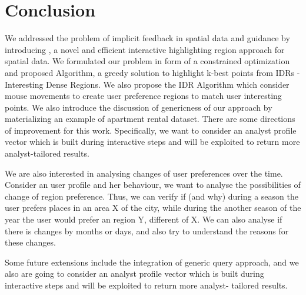 \section{Conclusion}
\label{sec:conc}
We addressed the problem of implicit feedback in spatial data and guidance by introducing \sgg , a novel and efficient interactive highlighting region approach for spatial data. We formulated our problem in form of a constrained optimization and proposed \sgg Algorithm, a greedy solution to highlight k-best points from IDRs - Interesting Dense Regions. We also propose the IDR Algorithm which consider mouse movements to create user preference regions to match user interesting points. We also introduce the discussion of genericness of our approach by materializing an example of apartment rental dataset. There are some directions of improvement for this work. Specifically, we want to consider an analyst profile vector which is built during interactive steps and will be exploited to return more analyst-tailored results.

We are also interested in analysing changes of user preferences over the time. Consider an user profile and her behaviour, we want to analyse the possibilities of change of region preference. Thus, we can verify if (and why) during a season the user prefers places in an area X of the city, while during the another season of the year the user would prefer an region Y, different of X. We can also analyse if there is changes by months or days, and also try to understand the reasons for these changes.

Some future extensions include the integration of generic query approach, and we also are going to consider an analyst profile vector which is built during interactive steps and will be exploited to return more analyst- tailored results.